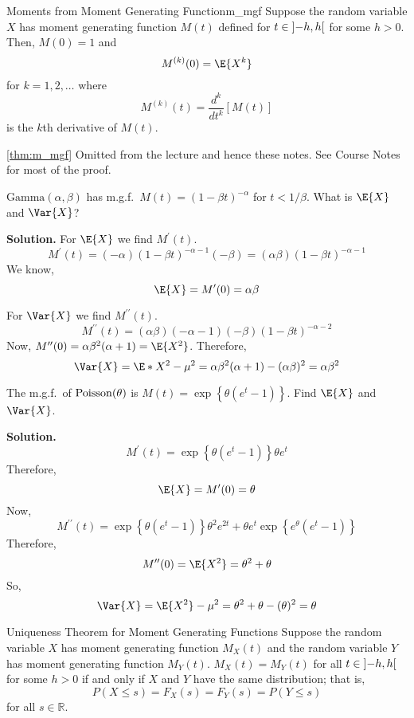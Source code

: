 \begin{Theorem}{Moments from Moment Generating Function}{m_mgf}
    Suppose the random variable $ X $ has moment generating
    function $ M(t) $ defined for $ t\in\interval[open]{-h}{h} $
    for some $ h>0 $. Then, $ M(0)=1 $ and
    \[ M^{(k)}(0)=\E{X^k} \]
    for $ k=1,2,\ldots $ where
    \[ M^{(k)}(t)=\frac{d^k}{dt^k} \left[ M(t) \right] \]
    is the $ k $th derivative of $ M(t) $.
\end{Theorem}
\begin{Proof}{\ref{thm:m_mgf}}{}
    Omitted from the lecture and hence these notes.
    See Course Notes for most of the proof.
\end{Proof}

\begin{Example}{}{}
    $ \text{Gamma}(\alpha,\beta) $ has m.g.f.\
    $ \displaystyle  M(t)=(1-\beta t)^{-\alpha} $
    for $ t<1/\beta $. What is $ \E{X} $ and $ \Var{X} $?

    \textbf{Solution.} For $ \E{X} $ we find $ M^\prime(t) $.
    \[ M^\prime(t)=(-\alpha)(1-\beta t)^{-\alpha-1}(-\beta)=
        (\alpha \beta)(1-\beta t)^{-\alpha-1} \]
    We know,
    \[ \E{X}=M^\prime(0)=\alpha\beta \]

    For $ \Var{X} $ we find $ M^{\prime\prime}(t) $.
    \[ M^{\prime\prime}(t)=(\alpha\beta)(-\alpha-1)(-\beta)(1-\beta t)^{-\alpha-2} \]
    Now, $ M^{\prime\prime}(0)=\alpha\beta^2(\alpha+1) =\E{X^2} $. Therefore,
    \[ \Var{X}=\E*{X^2}-\mu^2=\alpha\beta^2(\alpha+1)-(\alpha\beta)^2=\alpha\beta^2 \]
\end{Example}

\begin{Example}{}{}
    The m.g.f.\ of $ \operatorname{Poisson}(\theta) $ is $ \displaystyle  M(t)=\exp\left\{ \theta(e^t-1)\right\} $.
    Find $ \E{X} $ and $ \Var{X} $.

    \textbf{Solution.}
    \[ M^\prime(t)=\exp\left\{ \theta(e^t-1)\right\}\theta e^t \]
    Therefore,
    \[ \E{X}=M^\prime(0)=\theta \]
    Now,
    \[ M^{\prime\prime}(t)=
        \exp\left\{ \theta(e^t-1)\right\}\theta^2 e^{2t}+\theta e^t
        \exp\left\{ e^\theta(e^t-1)\right\} \]
    Therefore,
    \[ M^{\prime\prime}(0)=\E{X^2}=\theta^2+\theta \]
    So,
    \[ \Var{X}=\E{X^2}-\mu^2=\theta^2+\theta-(\theta)^2=\theta \]
\end{Example}

\begin{Theorem}{Uniqueness Theorem for Moment Generating Functions}{}
    Suppose the random variable $ X $ has moment generating function
    $ M_X(t) $ and the random variable $ Y $ has
    moment generating function $ M_Y(t) $.
    $ M_X(t) = M_Y(t) $ for all $ t\in\interval[open]{-h}{h} $
    for some $ h>0 $ if and only if $ X $ and $ Y $ have the same distribution;
    that is,
    \[ P(X\leqslant s)=F_X(s)=F_Y(s)=P(Y\leqslant s) \]
    for all $ s\in\mathbb{R} $.
\end{Theorem}

